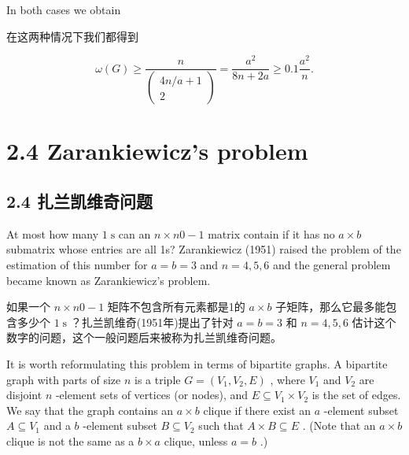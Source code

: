 \documentclass[10pt]{article}
\begin{document}
In both cases we obtain

\begin{tcolorbox}\relax
在这两种情况下我们都得到
\end{tcolorbox}

\[
\omega \left( G\right)  \geq  \frac{n}{\left( \begin{matrix} {4n}/a + 1 \\  2 \end{matrix}\right) } = \frac{{a}^{2}}{{8n} + {2a}} \geq  {0.1}\frac{{a}^{2}}{n}.
\]

\section*{2.4 Zarankiewicz's problem}

\begin{tcolorbox}\relax
\section*{2.4 扎兰凯维奇问题}
\end{tcolorbox}

At most how many \(1\mathrm{\;s}\) can an \(n \times  {n0} - 1\) matrix contain if it has no \(a \times  b\) submatrix whose entries are all 1s? Zarankiewicz (1951) raised the problem of the estimation of this number for \(a = b = 3\) and \(n = 4,5,6\) and the general problem became known as Zarankiewicz's problem.

\begin{tcolorbox}\relax
如果一个 \(n \times  {n0} - 1\) 矩阵不包含所有元素都是1的 \(a \times  b\) 子矩阵，那么它最多能包含多少个 \(1\mathrm{\;s}\) ？扎兰凯维奇(1951年)提出了针对 \(a = b = 3\) 和 \(n = 4,5,6\) 估计这个数字的问题，这个一般问题后来被称为扎兰凯维奇问题。
\end{tcolorbox}

It is worth reformulating this problem in terms of bipartite graphs. A bipartite graph with parts of size \(n\) is a triple \(G = \left( {{V}_{1},{V}_{2},E}\right)\) , where \({V}_{1}\) and \({V}_{2}\) are disjoint \(n\) -element sets of vertices (or nodes), and \(E \subseteq  {V}_{1} \times  {V}_{2}\) is the set of edges. We say that the graph contains an \(a \times  b\) clique if there exist an \(a\) -element subset \(A \subseteq  {V}_{1}\) and a \(b\) -element subset \(B \subseteq  {V}_{2}\) such that \(A \times  B \subseteq  E\) . (Note that an \(a \times  b\) clique is not the same as a \(b \times  a\) clique, unless \(a = b\) .)
\end{document}
